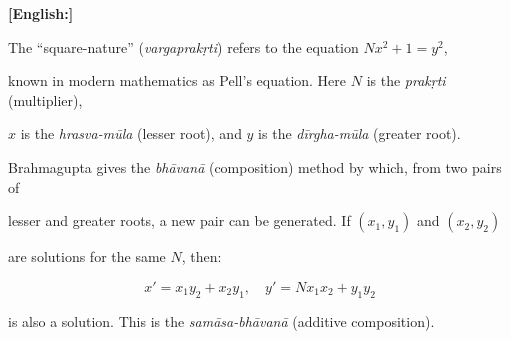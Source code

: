\documentclass[10pt,a4paper]{article}
\begin{document}
\begin{minipage}[t]{0.47\textwidth}


\end{minipage}%

\hfill\vline\hfill%

\begin{minipage}[t]{0.47\textwidth}

\textbf{[English:]}

The ``square-nature'' (\textit{vargaprakṛti}) refers to the equation $Nx^2 + 1 = y^2$,

known in modern mathematics as Pell's equation. Here $N$ is the \textit{prakṛti} (multiplier),

$x$ is the \textit{hrasva-mūla} (lesser root), and $y$ is the \textit{dīrgha-mūla} (greater root).



Brahmagupta gives the \textit{bhāvanā} (composition) method by which, from two pairs of

lesser and greater roots, a new pair can be generated. If $(x_1, y_1)$ and $(x_2, y_2)$

are solutions for the same $N$, then:

\[x' = x_1 y_2 + x_2 y_1, \quad y' = N x_1 x_2 + y_1 y_2\]

is also a solution. This is the \textit{samāsa-bhāvanā} (additive composition).

\end{minipage}



\vspace{1.5em}
\end{document}
